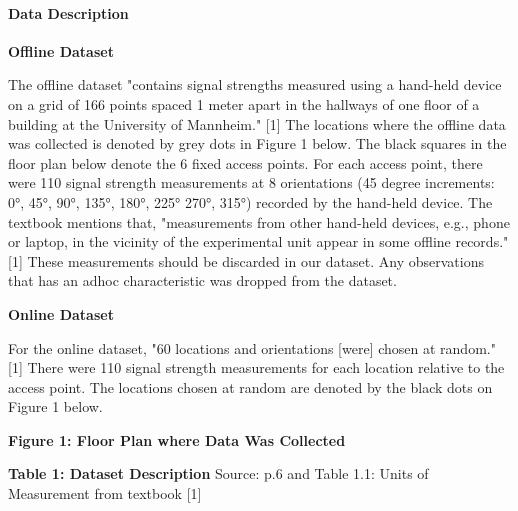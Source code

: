 \documentclass[11pt]{article}
\begin{document}
\paragraph{Data Description}\label{data-description}

\textbf{Offline Dataset}

The offline dataset "contains signal strengths measured using a
hand-held device on a grid of 166 points spaced 1 meter apart in the
hallways of one floor of a building at the University of Mannheim."
{[}1{]} The locations where the offline data was collected is denoted by
grey dots in Figure 1 below. The black squares in the floor plan below
denote the 6 fixed access points. For each access point, there were 110
signal strength measurements at 8 orientations (45 degree increments:
0°, 45°, 90°, 135°, 180°, 225° 270°, 315°) recorded by the hand-held
device. The textbook mentions that, "measurements from other hand-held
devices, e.g., phone or laptop, in the vicinity of the experimental unit
appear in some offline records." {[}1{]} These measurements should be
discarded in our dataset. Any observations that has an adhoc
characteristic was dropped from the dataset.

\textbf{Online Dataset}

For the online dataset, "60 locations and orientations {[}were{]} chosen
at random." {[}1{]} There were 110 signal strength measurements for each
location relative to the access point. The locations chosen at random
are denoted by the black dots on Figure 1 below.

\textbf{Figure 1: Floor Plan where Data Was Collected}

\textbf{Table 1: Dataset Description} Source: p.6 and Table 1.1: Units
of Measurement from textbook {[}1{]}
\end{document}
